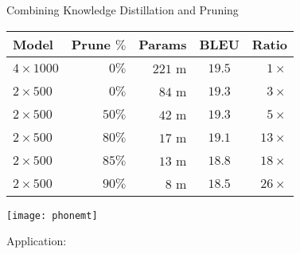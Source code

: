 \begin{frame}{Combining Knowledge Distillation and Pruning}
\air
\air
\begin{table}[t] \label{prune}
\centering
\small
\begin{tabular}{l  r  r c  r }
\toprule
Model & Prune $\%$ & Params & BLEU & Ratio \\
\midrule 
$4 \times 1000$ & $0\%$ &$221$ m& $19.5$& $1 \times$   \\
$2 \times 500$ &  $0\%$& $84$ m& $19.3$& $3 \times$   \\
$2 \times 500$ & $50\%$& $42$ m&  $19.3$ & $5 \times$ \\
$2 \times 500$ &  $80\%$& $17$ m&  $19.1$ & $13 \times$ \\
$2 \times 500$ &  $85\%$& $13$ m&  $18.8$ & $18 \times$ \\
$2 \times 500$ &  $90\%$& $8$ m &  $18.5$  & $26 \times$ \\

\bottomrule
\end{tabular}
\end{table}
\end{frame}


\begin{frame}
  
  \begin{center}
    \texttt{[image: phonemt]}
  \end{center}
\end{frame}

\begin{frame}{Application: }

\end{frame}

